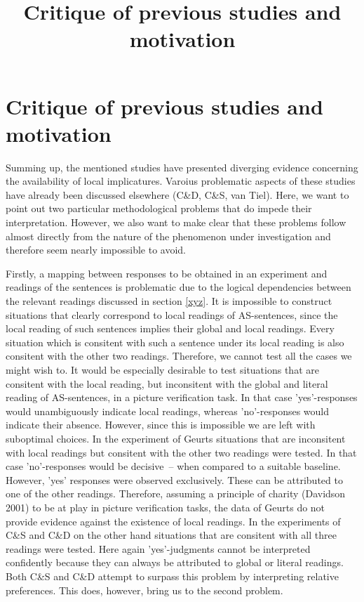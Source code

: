 \documentclass[a4paper,10pt]{article}
\title{Critique of previous studies and motivation}
\author{}
\begin{document}
\maketitle

\begin{abstract}

\end{abstract}

\section{Critique of previous studies and motivation}

Summing up, the mentioned studies have presented diverging evidence concerning the availability of local implicatures. Varoius problematic aspects of these studies have already been discussed elsewhere (C\&D, C\&S, van Tiel). Here, we want to point out two particular methodological problems that do impede their interpretation. However, we also want to make clear that these problems follow almost directly from the nature of the phenomenon under investigation and therefore seem nearly impossible to avoid.   

Firstly,  a mapping between responses to be obtained in an experiment and readings of the sentences is problematic due to the logical dependencies between the relevant readings discussed in section \ref{xyz}. It is impossible to construct situations that clearly correspond to local readings of AS-sentences, since the local reading of such sentences implies their global and local readings. Every situation which is consitent with such a sentence under its local reading is also consitent with the other two readings. Therefore, we cannot test all the cases we might wish to. It would be especially desirable to test situations that are consitent with the local reading, but inconsitent with the global and literal reading of AS-sentences, in a picture verification task. In that case 'yes'-responses would unambiguously indicate local readings, whereas 'no'-responses would indicate their absence. However, since this is impossible we are left with suboptimal choices. In the experiment of Geurts situations that are inconsitent with local readings but consitent with the other two readings were tested. In that case 'no'-responses would be decisive~-- when compared to a suitable baseline. However, 'yes' responses were observed exclusively. These can be attributed to one of the other readings. Therefore, assuming a principle of charity (Davidson 2001) to be at play in picture verification tasks, the data of Geurts do not provide evidence against the existence of local readings.  In  the experiments of C\&S and C\&D on the other hand situations that are consitent with all three readings were tested. Here again 'yes'-judgments cannot be interpreted confidently because they can always be attributed to global or literal readings. Both C\&S and C\&D attempt to surpass this problem by interpreting relative preferences. This does, however, bring us to the second problem.
\end{document}
